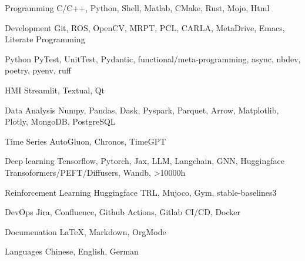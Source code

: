 \documentclass[../cv.tex]{subfiles}
\begin{document}


\begin{cvskills}

  \cvskill
    {Programming} %
    {C/C++, Python, Shell, Matlab, CMake, Rust, Mojo, Html} %

  \cvskill
    {Development} %
    {Git, ROS, OpenCV, MRPT, PCL, CARLA, MetaDrive, Emacs, Literate Programming} %

  \cvskill
    {Python} %
    {PyTest, UnitTest, Pydantic, functional/meta-programming, async, nbdev, poetry, pyenv, ruff} %

  \cvskill
    {HMI} %
    {Streamlit, Textual, Qt} %

  \cvskill
    {Data Analysis} %
    {Numpy, Pandas, Dask, Pyspark, Parquet, Arrow, Matplotlib, Plotly, MongoDB, PostgreSQL} %

  \cvskill
    {Time Series} %
    {AutoGluon, Chronos, TimeGPT} %

  \cvskill
    {Deep learning} %
    {Tensorflow, Pytorch, Jax, LLM, Langchain, GNN, Huggingface Transoformers/PEFT/Diffusers, Wandb, >10000h} %

  \cvskill
    {Reinforcement Learning} %
    {Huggingface TRL, Mujoco, Gym, stable-baselines3} %

  \cvskill
    {DevOps} %
    {Jira, Confluence, Github Actions, Gitlab CI/CD, Docker} %

  \cvskill
    {Documenation} %
    {LaTeX, Markdown, OrgMode} %

  \cvskill
    {Languages} %
    {Chinese, English, German} %

\end{cvskills}
\end{document}
